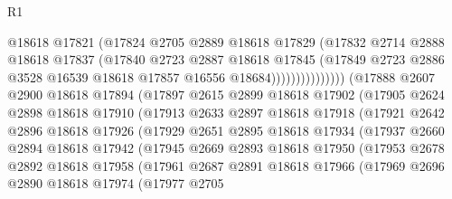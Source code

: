 \begin{lexlean}{R1}
\begin{coremodule}
                              @18618
                              @17821
                              (@17824
                                @2705
                                @2889
                                @18618
                                @17829
                                (@17832
                                  @2714
                                  @2888
                                  @18618
                                  @17837
                                  (@17840
                                    @2723
                                    @2887
                                    @18618
                                    @17845
                                    (@17849
                                      @2723
                                      @2886
                                      @3528
                                      @16539
                                      @18618
                                      @17857
                                      @16556
                                      @18684)))))))))))))))
        (@17888
          @2607
          @2900
          @18618
          @17894
          (@17897
            @2615
            @2899
            @18618
            @17902
            (@17905
              @2624
              @2898
              @18618
              @17910
              (@17913
                @2633
                @2897
                @18618
                @17918
                (@17921
                  @2642
                  @2896
                  @18618
                  @17926
                  (@17929
                    @2651
                    @2895
                    @18618
                    @17934
                    (@17937
                      @2660
                      @2894
                      @18618
                      @17942
                      (@17945
                        @2669
                        @2893
                        @18618
                        @17950
                        (@17953
                          @2678
                          @2892
                          @18618
                          @17958
                          (@17961
                            @2687
                            @2891
                            @18618
                            @17966
                            (@17969
                              @2696
                              @2890
                              @18618
                              @17974
                              (@17977
                                @2705

\end{coremodule}
\end{lexlean}
